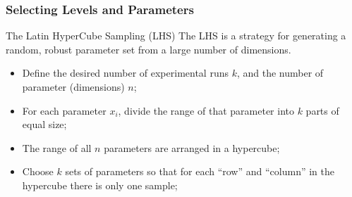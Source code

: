 \documentclass[10pt]{beamer}
\begin{document}
\begin{frame}
  \frametitle{Selecting Levels and Parameters}
  \begin{block}{The Latin HyperCube Sampling (LHS)}
    The LHS is a strategy for generating a random, robust parameter
    set from a large number of dimensions.
  \end{block}
  \begin{itemize}
  \item Define the desired number of experimental runs $k$, and the
    number of parameter (dimensions) $n$;
  \item For each parameter $x_i$, divide the range of that parameter
    into $k$ parts of equal size;
  \item The range of all $n$ parameters are arranged in a hypercube;
  \item Choose $k$ sets of parameters so that for each ``row'' and
    ``column'' in the hypercube there is only one sample;
  \end{itemize}
\end{frame}
\end{document}
